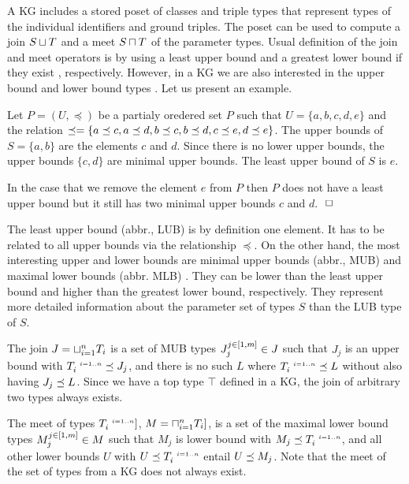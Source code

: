 \documentclass[runningheads]{llncs}
\newcommand{\s}{\scriptscriptstyle\ \,}
\newcommand{\finbox}{\phantom{.}\hfill\Box}
\begin{document}
A KG includes a stored poset of classes and triple types that
represent types of the individual identifiers and ground triples. The
poset can be used to compute a join $S\sqcup\/T$ and a meet
$S\sqcap\/T$ of the parameter types. Usual definition of the join and
meet operators is by using a least upper bound and a greatest lower
bound if they exist \cite{Pierce2002}, respectively. However, in a KG
we are also interested in the upper bound and lower bound types
\cite{DaveyPriestley2002}. Let us present an example.

\begin{example}
  Let $P=(U,\preceq)$ be a partialy oredered set $P$ such that
  $U=\{a,b,c,d,e\}$ and the relation
  $\preceq=\{a\preceq\/c,a\preceq\/d,b\preceq\/c,b\preceq\/d,c\preceq\/e,d\preceq\/e\}$.
  The upper bounds of $S=\{a,b\}$ are the elements $c$ and $d$. Since
  there is no lower upper bounds, the upper bounds $\{c,d\}$ are
  minimal upper bounds. The least upper bound of $S$ is $e$.

  In the case that we remove the element $e$ from $P$ then $P$ does
  not have a least upper bound but it still has two minimal upper
  bounds $c$ and $d$. $\finbox$
\end{example}

The least upper bound (abbr., LUB) is by definition one element. It has
to be related to all upper bounds via the relationship $\preceq$. On
the other hand, the most interesting upper and lower bounds are
minimal upper bounds (abbr., MUB) and maximal lower bounds (abbr. MLB)
\cite{Knudstorp2024}. They can be lower than the least upper bound and
higher than the greatest lower bound, respectively. They represent
more detailed information about the parameter set of types $S$ than
the LUB type of $S$.

The join $J=\sqcup_{i=1}^n\/T_i$ is a set of MUB types
$J_j^{j\in[1,m]}\in\/J$ such that $J_j$ is an upper bound with
$T_i^{\s\/i=1..n}\preceq\/J_j$, and there is no such $L$ where
$T_i^{\s\/i=1..n}\preceq\/L$ without also having $J_j\preceq\/L$. Since
we have a top type $\top$ defined in a KG, the join of arbitrary two
types always exists.

The meet of types $T_i^{\s\/i=1..n}]$, $M=\sqcap_{i=1}^n\/T_i]$, is
a set of the maximal lower bound types $M_j^{j\in[1,m]}\in\/M$ such
that $M_j$ is lower bound with $M_j\preceq\/T_i^{\s\/i=1..n}$, and all
other lower bounds $U$ with $U\preceq\/T_i^{\s\/i=1..n}$ entail
$U\preceq\/M_j$. Note that the meet of the set of types from a KG does
not always exist.
\end{document}
